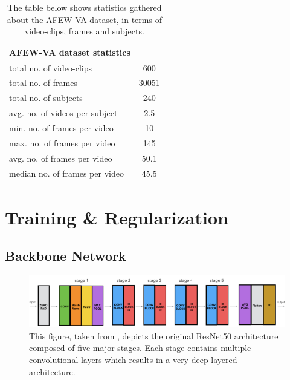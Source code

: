 \begin{table}[H]
\caption[AFEW-VA dataset statistics]{The table below shows statistics gathered about the AFEW-VA dataset, in terms of video-clips, frames and subjects.}
\begin{center}
\begin{tabular}{@{}lc@{}}
\toprule
\textbf{AFEW-VA dataset statistics} &  \\ \midrule
total no. of video-clips & 600 \\
total no. of frames & 30051 \\
total no. of subjects & 240 \\
avg. no. of videos per subject & 2.5 \\
min. no. of frames per video & 10 \\
max. no. of frames per video & 145 \\
avg. no. of frames per video & 50.1 \\
median no. of frames per video & 45.5 \\ \bottomrule
\end{tabular}
\label{tab:DatasetStatistics}
\end{center}
\end{table}

\section{Training \& Regularization}
\subsection{Backbone Network}

\begin{figure}[H]
  \begin{center}
  \includegraphics[angle=0, width=1.0\textwidth]{Figures/resnet50.png}
  \caption[ResNet50 architecture overview]{This figure, taken from \citep{Dwivedi:2019:ResNetInKeras}, depicts the original ResNet50 \citep{He:2015:DeepResidualLearningForImageRecognition} architecture composed of five major stages. Each stage contains multiple convolutional layers which results in a very deep-layered architecture.}
  \label{fig:ResNet50Architecture}
  \end{center}
\end{figure}

